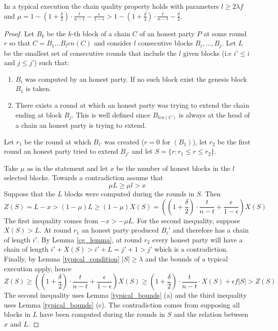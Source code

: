 \documentclass[..]{subfiles}
\begin{document}
\begin{theorem}\label{theorem:cq}
	In a typical execution the chain quality property holds with parameters $l \ge 2 \lambda f$ and $\mu = 1 - (1+\frac{\delta}{2}) \cdot \frac{t}{n-t} - \frac{\epsilon}{1-\epsilon} > 1 - (1+\frac{\delta}{2}) \cdot \frac{t}{n-t} - \frac{\delta}{2}$.
\end{theorem}
\begin{proof}
	Let $B_k$ be the $k$-th block of a chain $C$ of an honest party $P$ at some round $r$ so that $C = B_1 \dots B_len(C)$ and consider $l$ consecutive blocks $B_i,\dots,B_j$. Let $L$ be the smallest set of consecutive rounds that include the $l$ given blocks (i.e $i' \le i$ and $j \le j'$) such that:
	\begin{enumerate}
		\item $B_i$ was computed by an honest party. If no such block exist the genesis block $B_1$ is taken.
		\item There exists a round at which an honest party was trying to extend the chain ending at block $B_j$. This is well defined since $B_{len(C)}$ is always at the head of a chain an honest party is trying to extend.
	\end{enumerate}
	Let $r_1$ be the round at which $B_{i'}$ was created ($r=0$ for $(B_1)$), let $r_2$ be the first round an honest party tried to extend $B_{j'}$ and let $S = \{r: r_1 \le r \le r_2\}$.

	Take $\mu$ as in the statement and let $x$ be the number of honest blocks in the $l$ selected blocks. Towards a contradiction assume that $$\mu L \ge \mu l > x$$
	Suppose that the $L$ blocks were computed during the rounds in $S$. Then
	$$Z(S) = L - x > (1-\mu)L \ge (1-\mu)X(S) =  \left(\left(1+\frac{\delta}{2}\right) \cdot \frac{t}{n-t} + \frac{\epsilon}{1-\epsilon}\right)X(S)$$
	The first inequality comes from $-x > -\mu L$. For the second inequality, suppose $X(S) > L$. At round $r_1$ an honest party produced $B_i'$ and therefore has a chain of length $i'$. By Lemma \ref{cg_lemma}, at round $r_2$ every honest party will have a chain of length $i' + X(S) > i' + L = j' + 1 > j'$ which is a contradiction.
	Finally, by Lemma \ref{typical_condition} $|S| \ge \lambda$ and the bounds of a typical execution apply, hence
	$$Z(S) \ge \left(\left(1+\frac{\delta}{2}\right) \cdot \frac{t}{n-t} + \frac{\epsilon}{1-\epsilon}\right)X(S) \ge \left(1 + \frac{\delta}{2}\right) \cdot \frac{t}{n-t} \cdot X(S) + \epsilon f |S| > Z(S)$$
	The second inequality uses Lemma \ref{typical_bounds} (a) and the third inequality uses Lemma \ref{typical_bounds} (c). The contradiction comes from supposing all blocks in $L$ have been computed during the rounds in $S$ and the relation between $x$ and $L$.


\end{proof}
\end{document}
